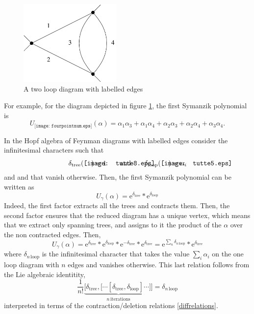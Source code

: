 \documentclass[10pt,here,feynmf]{article}
\begin{document}
\begin{figure}
\begin{center}
\includegraphics[width=5cm]{fourpointnum.pdf}
\caption{A two loop diagram with labelled edges}
\label{fourpointlab}
\end{center}
\end{figure}
For example, for the diagram depicted in figure \ref{fourpointlab}, the first Symanzik polynomial is 
\begin{equation}
U_{\texttt{[image: fourpointnum.eps]}}(\alpha)=
\alpha_{1}\alpha_{3}+\alpha_{1}\alpha_{4}+\alpha_{2}\alpha_{3}+\alpha_{2}\alpha_{4}+\alpha_{3}\alpha_{4}.
\end{equation}




In the Hopf algebra of Feynman diagrams with labelled edges consider the infinitesimal characters such that
\begin{equation}
\delta_{\mathrm{tree}}(\parbox{0.4cm}{\mbox{\texttt{[image: tutte8.eps]}}})=1
\qquad\mathrm{and}\qquad
\delta_{\mathrm{loop}}(\parbox{0.4cm}{\mbox{\texttt{[image: tutte5.eps]}}})=\alpha_{i}
\end{equation}
and and that vanish otherwise.  Then, the first Symanzik polynomial can be written as
\begin{equation}
U_{\gamma}(\alpha)=
\mathrm{e}^{\delta_{\mathrm{tree}}}\ast
\mathrm{e}^{\delta_{\mathrm{loop}}}
\end{equation}
Indeed, the first factor extracts all the trees and contracts them. Then, the second factor ensures that the reduced diagram has a unique vertex, which means that we extract only spanning trees, and assigns to it the product of the $\alpha$ over the non contracted edges. Then, 
\begin{equation}
U_{\gamma}(\alpha)=\mathrm{e}^{\delta_{\mathrm{tree}}}\ast\mathrm{e}^{\delta_{\mathrm{loop}}}\ast
\mathrm{e}^{-\delta_{\mathrm{tree}}}\ast\mathrm{e}^{\delta_{\mathrm{tree}}}
=
\mathrm{e}^{\sum_{n}\delta_{n\,\mathrm{loop}}}\ast\mathrm{e}^{\delta_{\mathrm{tree}}}
\end{equation}
where $\delta_{n\,\mathrm{loop}}$ is the infinitesimal character that takes the value $\sum_{i}\alpha_{i}$  
on the one loop diagram with $n$ edges and vanishes otherwise. This last relation follows from the Lie algebraic identitity,  
\begin{equation}
\frac{1}{n!}\underbrace{\Big[\delta_{\mathrm{tree}},\big[\cdots\left[\delta_{\mathrm{tree}},\delta_{\mathrm{loop}}\right]\cdots\big]\Big]}_{n\,\mathrm{iterations}}=\delta_{n\,\mathrm{loop}}
\end{equation}
interpreted in terms of the  contraction/deletion relations \eqref{diffrelations}.
\end{document}
